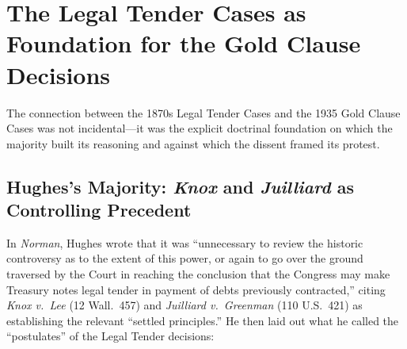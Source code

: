 \documentclass[12pt]{article}
\begin{document}
\section{The Legal Tender Cases as Foundation for the Gold Clause
Decisions}

The connection between the 1870s Legal Tender Cases and the 1935 Gold
Clause Cases was not incidental---it was the explicit doctrinal
foundation on which the majority built its reasoning and against which
the dissent framed its protest.

\subsection{Hughes's Majority: \textit{Knox} and \textit{Juilliard} as
Controlling Precedent}

In \textit{Norman}, Hughes wrote that it was ``unnecessary to review
the historic controversy as to the extent of this power, or again to
go over the ground traversed by the Court in reaching the conclusion
that the Congress may make Treasury notes legal tender in payment of
debts previously contracted,'' citing \textit{Knox v.\ Lee} (12 Wall.\
457) and \textit{Juilliard v.\ Greenman} (110 U.S.\ 421) as
establishing the relevant ``settled principles.'' He then laid out
what he called the ``postulates'' of the Legal Tender decisions:
\end{document}
